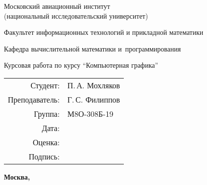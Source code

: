 \begin{titlepage}
\begin{center}
\bfseries

{\Large Московский авиационный институт\\ (национальный исследовательский университет)}

\vspace{48pt}

{\large Факультет информационных технологий и прикладной математики}

\vspace{36pt}

{\large Кафедра вычислительной математики и~программирования}


\vspace{48pt}

Курсовая работа по курсу \enquote{Компьютерная графика}

\end{center}

\vspace{72pt}

\begin{flushright}
\begin{tabular}{rl}
Студент: & П.\,А. Мохляков \\
Преподаватель: & Г.\,С. Филиппов \\
Группа: & М8О-308Б-19 \\
Дата: & \\
Оценка: & \\
Подпись: & \\
\end{tabular}
\end{flushright}

\vfill

\begin{center}
\bfseries
Москва, \the\year
\end{center}
\end{titlepage}

\pagebreak
